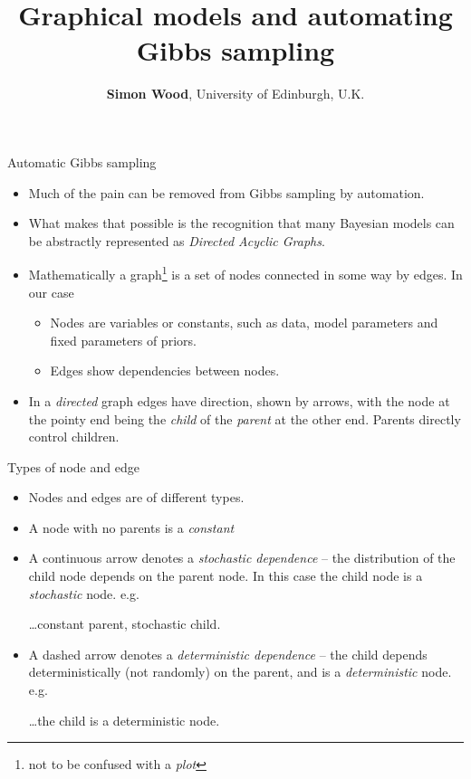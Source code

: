 \documentclass{beamer}
\title{Graphical models and automating Gibbs sampling}
\author{{\bf Simon Wood}, University of Edinburgh, U.K.}
\date{}
\newcommand{\eps}[3]
{{\begin{center}
 \rotatebox{#1}{\scalebox{#2}{\texttt{[image: \#3]}}}
 \end{center}}
}
\begin{document}
\begin{frame}
\titlepage
\end{frame}

\begin{frame}{Automatic Gibbs sampling}
\begin{itemize}
\item Much of the pain can be removed from Gibbs sampling by automation.
\item What makes that possible is the recognition that many Bayesian models can be abstractly represented as {\em Directed Acyclic Graphs}. 
\item Mathematically a graph\footnote{not to be confused with a {\em plot}} is a set of nodes connected in some way by edges. In our case 
\begin{itemize}
\item Nodes are variables or constants, such as data, model parameters and fixed parameters of priors.
\item Edges show dependencies between nodes.  
\end{itemize}
\item In a {\em directed} graph edges have direction, shown by arrows, with the node at the pointy end being the {\em child} of the {\em parent} at the other end. Parents directly control children. 
\eps{-90}{.4}{pc-dag.eps}
\end{itemize}
\end{frame}

\begin{frame}{Types of node and edge}
\begin{itemize}
\item Nodes and edges are of different types. 
\item A node with no parents is a {\em constant}
\item A continuous arrow denotes a {\em stochastic dependence} -- the distribution of the child node depends on the parent node. In this case the child node is a {\em stochastic} node. e.g. 
\eps{-90}{.4}{pc-dag.eps}
\ldots constant parent, stochastic child.
\item A dashed arrow denotes a {\em deterministic dependence} -- the child depends deterministically (not randomly) on the parent, and is a {\em deterministic} node. e.g.
\eps{-90}{.4}{stoch-dag.eps}
\ldots the child is a deterministic node.  
\end{itemize}
\end{frame}
\end{document}
